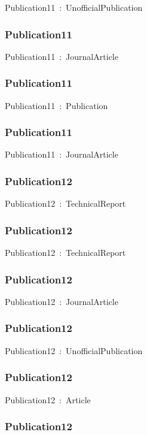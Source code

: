 \documentclass{article}
\begin{document}
Publication11~:~UnofficialPublication

\subsubsection*{Publication11}

Publication11~:~JournalArticle

\subsubsection*{Publication11}

Publication11~:~Publication

\subsubsection*{Publication11}

Publication11~:~JournalArticle

\subsubsection*{Publication12}

Publication12~:~TechnicalReport

\subsubsection*{Publication12}

Publication12~:~TechnicalReport

\subsubsection*{Publication12}

Publication12~:~JournalArticle

\subsubsection*{Publication12}

Publication12~:~UnofficialPublication

\subsubsection*{Publication12}

Publication12~:~Article

\subsubsection*{Publication12}
\end{document}
